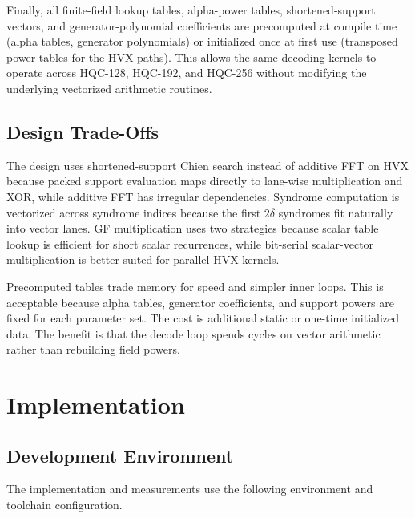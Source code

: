 \documentclass[12pt,a4paper]{report}
\begin{document}
Finally, all finite-field lookup tables, alpha-power tables, shortened-support vectors, and generator-polynomial coefficients are precomputed at compile time (alpha tables, generator polynomials) or initialized once at first use (transposed power tables for the HVX paths). This allows the same decoding kernels to operate across HQC-128, HQC-192, and HQC-256 without modifying the underlying vectorized arithmetic routines.

\section{Design Trade-Offs}
The design uses shortened-support Chien search instead of additive FFT on HVX because packed support evaluation maps directly to lane-wise multiplication and XOR, while additive FFT has irregular dependencies. Syndrome computation is vectorized across syndrome indices because the first \(2\delta\) syndromes fit naturally into vector lanes. GF multiplication uses two strategies because scalar table lookup is efficient for short scalar recurrences, while bit-serial scalar-vector multiplication is better suited for parallel HVX kernels.

Precomputed tables trade memory for speed and simpler inner loops. This is acceptable because alpha tables, generator coefficients, and support powers are fixed for each parameter set. The cost is additional static or one-time initialized data. The benefit is that the decode loop spends cycles on vector arithmetic rather than rebuilding field powers.

\chapter{Implementation}
\label{chap:implementation}

\section{Development Environment}
The implementation and measurements use the following environment and toolchain configuration.
\begin{table}[h]
\centering
\caption{Development and measurement environment.}
\end{table}
\end{document}
